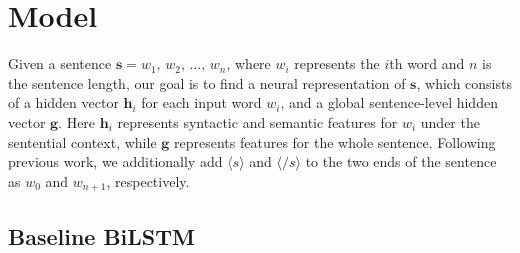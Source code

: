 \documentclass[11pt,a4paper]{article}
\begin{document}
\section{Model}
Given a sentence $\boldsymbol{s}=w_1,\, w_2, \, \dots , \, w_n$, where $w_i$ represents the $i$th word and $n$ is the sentence length, our goal is to find a neural representation of $\boldsymbol{s}$, which consists of a hidden vector $\boldsymbol{h}_i$ for each input word $w_i$, and a global sentence-level hidden vector $\boldsymbol{g}$. 
Here $\boldsymbol{h}_i$ represents syntactic and semantic features for $w_i$ under the sentential context, while $\boldsymbol{g}$ represents features for the whole sentence. 
Following previous work, we additionally add $\langle s \rangle$ and $\langle /s \rangle$ to the two ends of the sentence as $w_0$ and $w_{n+1}$, respectively.




\subsection{Baseline BiLSTM}
\label{sec:bilstm}

\end{document}
